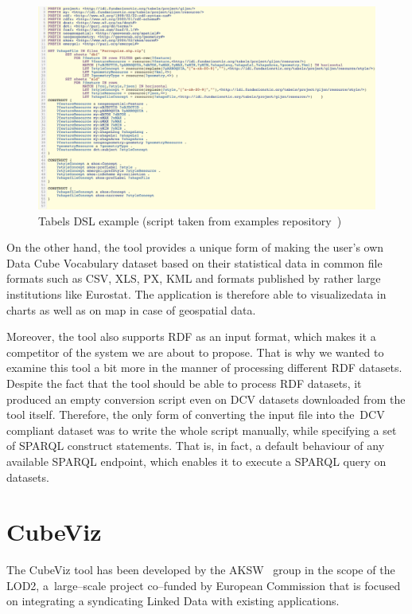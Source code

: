 \begin{figure}
	\centering
	\includegraphics[width=140mm]{img/tabels.png}
	\caption{Tabels DSL example (script taken from examples repository~\cite{tabels-web})}
	\label{fig:tabels}
\end{figure}

On the other hand, the tool provides a unique form of making the user's own Data Cube 
Vocabulary dataset based on their statistical data in common file formats such as 
CSV, XLS, PX, KML and formats published by rather large institutions like Eurostat. 
The application is therefore able to visualizedata in charts as well as on map 
in case of geospatial data.

Moreover, the tool also supports RDF as an input format, which makes it a 
competitor of the system we are about to propose. That is why we wanted
to examine this tool a bit more in the manner of processing different RDF 
datasets. Despite the fact that the tool should be able to process RDF 
datasets, it produced an empty conversion script even on DCV datasets downloaded 
from the tool itself. Therefore, the only form of converting the input file into 
the~DCV compliant dataset was to write the whole script manually, while 
specifying a set of SPARQL construct statements. That is, in fact, a default 
behaviour of any available SPARQL endpoint, which enables it to execute a SPARQL 
query on datasets.

\section{CubeViz}
\label{cubeviz}
The CubeViz tool has been developed by the AKSW~\cite{aksw} group
in the scope of the LOD2,
a~large--scale project co--funded by European Commission that is
focused on integrating a syndicating Linked Data with existing applications.

